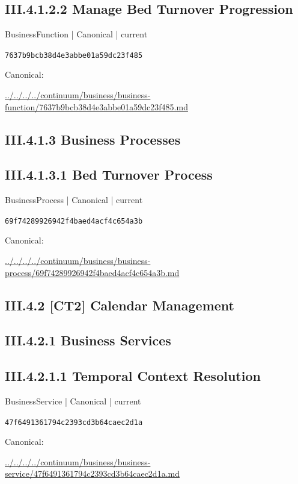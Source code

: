 \documentclass[10pt,a4paper]{article}
\begin{document}
\subsection*{III.4.1.2.2 Manage Bed Turnover Progression}
{\small BusinessFunction | Canonical | current}\par
\texttt{7637b9bcb38d4e3abbe01a59dc23f485}\par
Canonical: \par
{\footnotesize\url{../../../../continuum/business/business-function/7637b9bcb38d4e3abbe01a59dc23f485.md}}\par
\subsection*{III.4.1.3 Business Processes}
\subsection*{III.4.1.3.1 Bed Turnover Process}
{\small BusinessProcess | Canonical | current}\par
\texttt{69f74289926942f4baed4acf4c654a3b}\par
Canonical: \par
{\footnotesize\url{../../../../continuum/business/business-process/69f74289926942f4baed4acf4c654a3b.md}}\par
\subsection*{III.4.2 [CT2] Calendar Management}
\subsection*{III.4.2.1 Business Services}
\subsection*{III.4.2.1.1 Temporal Context Resolution}
{\small BusinessService | Canonical | current}\par
\texttt{47f6491361794c2393cd3b64caec2d1a}\par
Canonical: \par
{\footnotesize\url{../../../../continuum/business/business-service/47f6491361794c2393cd3b64caec2d1a.md}}\par
\end{document}
